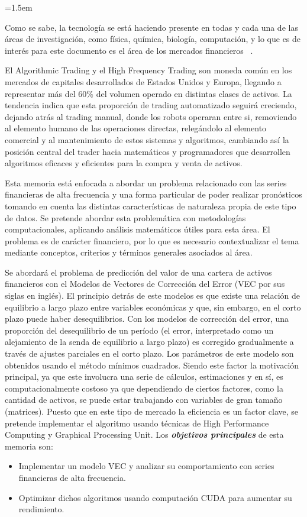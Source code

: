 \parindent=1.5em

Como se sabe, la tecnología se está haciendo presente en todas y cada una de
las áreas de investigación, como física, química, biología, computación, y lo
que es de interés para este documento es el área de los mercados financieros
~\citep{watsham1997quantitative}.

El Algorithmic Trading y el High Frequency Trading son moneda común en los
mercados de capitales desarrollados de Estados Unidos y Europa, llegando a
representar más del 60\% del volumen operado en distintas clases de activos. La
tendencia indica que esta proporción de trading automatizado seguirá creciendo,
dejando atrás al trading manual, donde los robots operaran entre si, removiendo
al elemento humano de las operaciones directas, relegándolo al elemento
comercial y al mantenimiento de estos sistemas y algoritmos, cambiando así la
posición central del trader hacia matemáticos y programadores que desarrollen
algoritmos eficaces y eficientes para la compra y venta de activos.

Esta memoria está enfocada a abordar un problema relacionado con las series
financieras de alta frecuencia y una forma particular de poder realizar
pronósticos tomando en cuenta las distintas características de naturaleza
propia de este tipo de datos. Se pretende abordar esta problemática con
metodologías computacionales, aplicando análisis matemáticos útiles para esta
área. El problema es de carácter financiero, por lo que es necesario
contextualizar el tema mediante conceptos, criterios y términos generales
asociados al área.

Se abordará el problema de predicción del valor de una cartera de activos
financieros con el Modelos de Vectores de Corrección del Error (VEC por sus
siglas en inglés). El principio detrás de este modelos es que existe una
relación de equilibrio a largo plazo entre variables económicas y que, sin
embargo, en el corto plazo puede haber desequilibrios. Con los modelos de
corrección del error, una proporción del desequilibrio de un período (el error,
interpretado como un alejamiento de la senda de equilibrio a largo plazo) es
corregido gradualmente a través de ajustes parciales en el corto plazo.  Los
parámetros de este modelo son obtenidos usando el método mínimos cuadrados.
Siendo este factor la motivación principal, ya que este involucra una serie de
cálculos, estimaciones y en sí, es computacionalmente costoso ya que
dependiendo de ciertos factores, como la cantidad de activos, se puede estar
trabajando con variables de gran tamaño (matrices). Puesto que en este tipo de
mercado la eficiencia es un factor clave, se pretende implementar el algoritmo
usando técnicas de High Performance Computing y Graphical Processing Unit.
\newpage
\noindent Los \emph{\textbf{objetivos principales}} de esta memoria son:
\begin{itemize}
	\item Implementar un modelo VEC y analizar su comportamiento con
series financieras de alta frecuencia.
	\item Optimizar dichos algoritmos usando computación CUDA para aumentar su rendimiento.
\end{itemize} 

